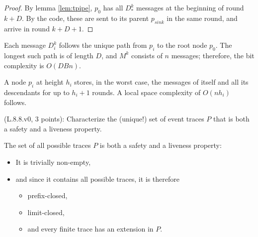 \begin{proof}
By lemma \ref{lem:tpipe}, $p_0$ has all $D_*^k$ messages at the beginning
of round $k + D$. By the code, these are sent to its parent $p_{sink}$ in the same
round, and arrive in round $k + D + 1$.
\end{proof}

Each message $D_i^k$ follows the unique path from $p_i$ to the root node $p_0$.
The longest such path is of length $D$, and $M^k$ consists of $n$ messages; therefore, the bit complexity is $O(DBn)$.

A node $p_i$ at height $h_i$ stores, in the worst case, the messages of itself and
all its descendants for up to $h_i + 1$ rounds. A local space complexity of
$O(nh_i)$ follows.


\begin{Exc}{(L.8.8.v0, 3 points):}
Characterize the (unique!) set of event traces $P$ that is both
a safety and a liveness property.
\end{Exc}


The set of all possible traces $P$ is both a safety and a liveness property:

\begin{itemize}
\item It is trivially non-empty,
\item and since it contains all possible traces, it is therefore
    \begin{itemize}
    \item prefix-closed,
    \item limit-closed,
    \item and every finite trace has an extension in $P$.
    \end{itemize}
\end{itemize}


